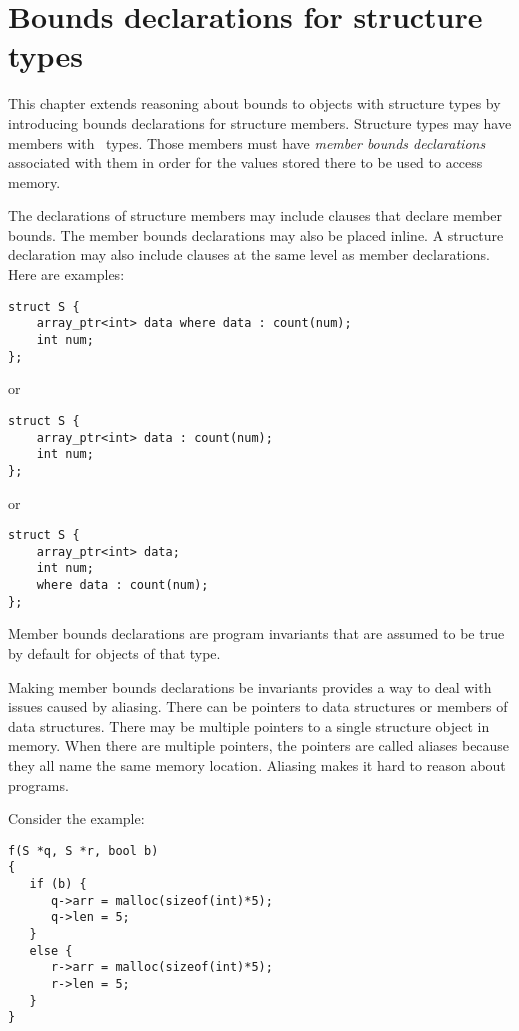
\chapter{Bounds declarations for structure types}
\label{chapter:structure-bounds}

This chapter extends reasoning about bounds to objects with structure
types by introducing bounds declarations for structure members.
Structure types may have members with \arrayptr\ types. Those
members must have \emph{member bounds declarations} associated with them in order for
the values stored there to be used to access memory.

The declarations of
structure members may include  clauses that declare member
bounds. The member bounds declarations may also be placed inline.
A structure declaration may also include  clauses at the same
level as member declarations.  Here are examples:

\begin{lstlisting}
struct S {
    array_ptr<int> data where data : count(num);
    int num;
};
\end{lstlisting}
or
\begin{lstlisting}
struct S {
    array_ptr<int> data : count(num);
    int num;
};
\end{lstlisting}
or
\begin{lstlisting}
struct S {
    array_ptr<int> data;
    int num;
    where data : count(num);
};
\end{lstlisting}

Member bounds declarations are program invariants that are assumed to be true
by default for objects of that type.

Making member bounds declarations be invariants provides a way to deal with issues
caused by aliasing. There can be pointers to data structures or members
of data structures. There may be multiple pointers to a single
structure object in memory. When there are multiple pointers,
the pointers are called aliases because they all name the same
memory location.  Aliasing makes it hard to reason about programs.

Consider the example:
\begin{lstlisting}
f(S *q, S *r, bool b)
{
   if (b) {
      q->arr = malloc(sizeof(int)*5);
      q->len = 5;
   }
   else {
      r->arr = malloc(sizeof(int)*5);
      r->len = 5;
   }
}
\end{lstlisting}

